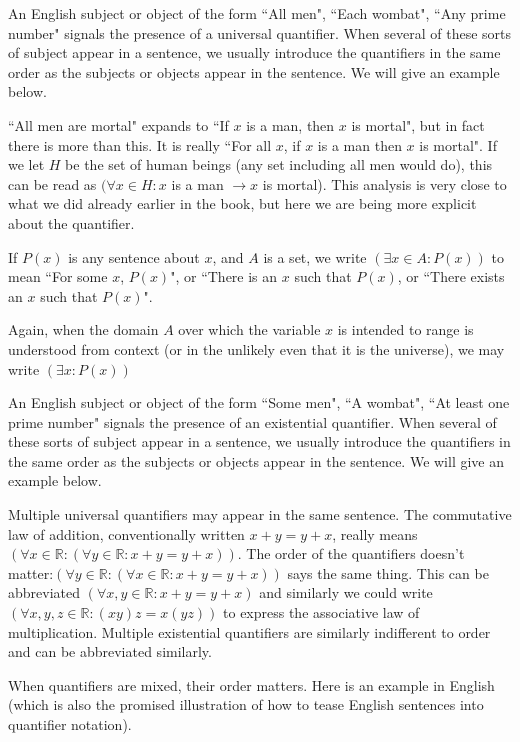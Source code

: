 \documentclass[12pt]{article}
\begin{document}
An English subject or object of the form ``All men",  ``Each wombat", ``Any prime number" signals the presence of a universal quantifier.
When several of these sorts of subject appear in a sentence, we usually introduce the quantifiers in the same order as the subjects or objects
appear in the sentence.  We will give an example below.

``All men are mortal" expands to ``If $x$ is a man, then $x$ is mortal", but in fact there is more than this.  It is really ``For all $x$, if $x$ is a man then $x$ is mortal".  If we let $H$ be the set of human beings (any set including all men would do), this can be read as $(\forall x \in H:x$ is a man $\rightarrow x$ is mortal).  This analysis is very close to what we did already earlier in the book, but here we are being more explicit about the quantifier.

If $P(x)$ is any sentence about $x$, and $A$ is a set, we write $(\exists x \in A:P(x))$ to mean ``For some $x$, $P(x)$", or ``There is an $x$ such that $P(x)$, or ``There exists an $x$ such that $P(x)$".

Again, when the domain $A$ over which the variable $x$ is intended to range is understood from context (or in the unlikely even that it is the universe), we may write 
$(\exists x:P(x))$

An English subject or object of the form ``Some men",  ``A wombat", ``At least one prime number" signals the presence of an existential quantifier.
When several of these sorts of subject appear in a sentence, we usually introduce the quantifiers in the same order as the subjects or objects
appear in the sentence.  We will give an example below.

Multiple universal quantifiers may appear in the same sentence.  The commutative law of addition, conventionally written $x+y=y+x$, really means
$(\forall x \in {\mathbb R}:(\forall y \in {\mathbb R}: x+y=y+x))$.  The order of the quantifiers doesn't matter:$(\forall y \in {\mathbb R}:(\forall x \in {\mathbb R}: x+y=y+x))$ says the same thing.  This can be abbreviated $(\forall x,y\in {\mathbb R}:x+y=y+x)$ and similarly we could write $(\forall x,y,z\in {\mathbb R}:(xy)z=x(yz))$ to express the associative law of multiplication.  Multiple existential quantifiers are similarly indifferent to order and can be abbreviated similarly.

When quantifiers are mixed, their order matters.  Here is an example in English (which is also the promised illustration of how to tease English sentences into quantifier notation).
\end{document}
